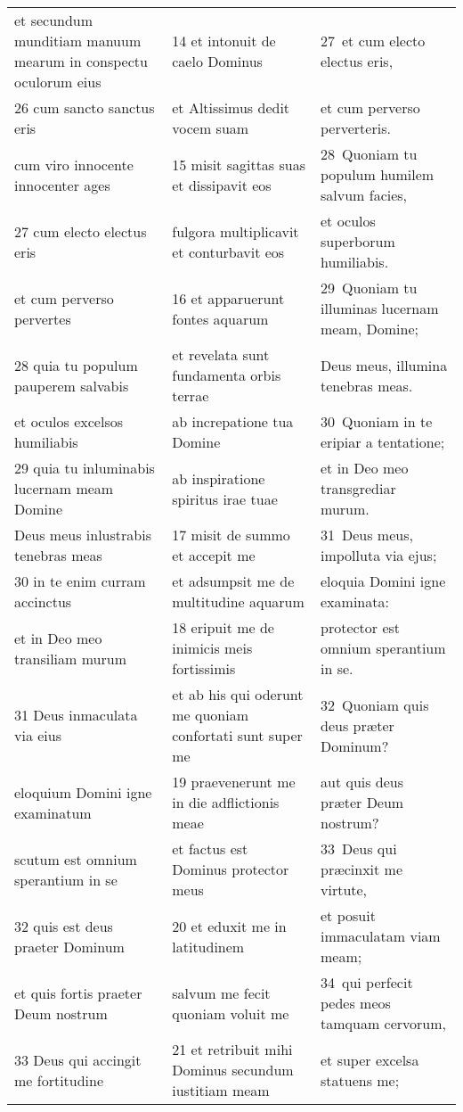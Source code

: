 \documentclass{article}
\begin{document}
\begin{longtable}{@{}p{}p{}p{}@{}}
et secundum munditiam manuum mearum in conspectu oculorum eius	&	14 et intonuit de caelo Dominus	&	27 et cum electo electus eris,	\\
26 cum sancto sanctus eris	&	et Altissimus dedit vocem suam	&	et cum perverso perverteris.	\\
cum viro innocente innocenter ages	&	15 misit sagittas suas et dissipavit eos	&	28 Quoniam tu populum humilem salvum facies,	\\
27 cum electo electus eris	&	fulgora multiplicavit et conturbavit eos	&	et oculos superborum humiliabis.	\\
et cum perverso pervertes	&	16 et apparuerunt fontes aquarum	&	29 Quoniam tu illuminas lucernam meam, Domine;	\\
28 quia tu populum pauperem salvabis	&	et revelata sunt fundamenta orbis terrae	&	Deus meus, illumina tenebras meas.	\\
et oculos excelsos humiliabis	&	ab increpatione tua Domine	&	30 Quoniam in te eripiar a tentatione;	\\
29 quia tu inluminabis lucernam meam Domine	&	ab inspiratione spiritus irae tuae	&	et in Deo meo transgrediar murum.	\\
Deus meus inlustrabis tenebras meas	&	17 misit de summo et accepit me	&	31 Deus meus, impolluta via ejus;	\\
30 in te enim curram accinctus	&	et adsumpsit me de multitudine aquarum	&	eloquia Domini igne examinata:	\\
et in Deo meo transiliam murum	&	18 eripuit me de inimicis meis fortissimis	&	protector est omnium sperantium in se.	\\
31 Deus inmaculata via eius	&	et ab his qui oderunt me quoniam confortati sunt super me	&	32 Quoniam quis deus præter Dominum?	\\
eloquium Domini igne examinatum	&	19 praevenerunt me in die adflictionis meae	&	aut quis deus præter Deum nostrum?	\\
scutum est omnium sperantium in se	&	et factus est Dominus protector meus	&	33 Deus qui præcinxit me virtute,	\\
32 quis est deus praeter Dominum	&	20 et eduxit me in latitudinem	&	et posuit immaculatam viam meam;	\\
et quis fortis praeter Deum nostrum	&	salvum me fecit quoniam voluit me	&	34 qui perfecit pedes meos tamquam cervorum,	\\
33 Deus qui accingit me fortitudine	&	21 et retribuit mihi Dominus secundum iustitiam meam	&	et super excelsa statuens me;	\\

\end{longtable}
\end{document}
